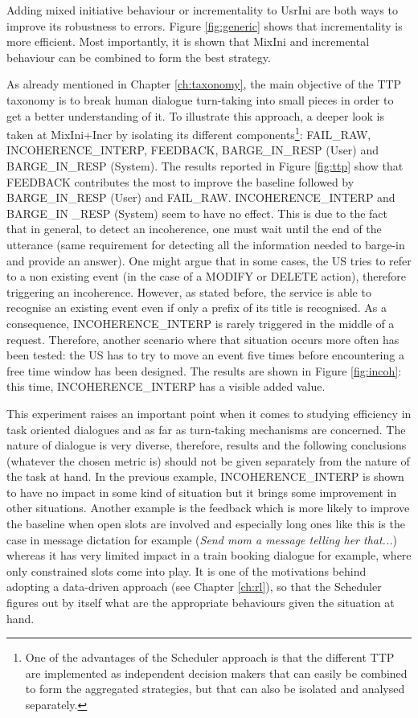      	Adding mixed initiative behaviour or incrementality to UsrIni are both ways to improve its robustness to errors. Figure \ref{fig:generic} shows that incrementality is more efficient. Most importantly, it is shown that MixIni and incremental behaviour can be combined to form the best strategy.
    
    	As already mentioned in Chapter \ref{ch:taxonomy}, the main objective of the TTP taxonomy is to break human dialogue turn-taking into small pieces in order to get a better understanding of it. To illustrate this approach, a deeper look is taken at MixIni+Incr by isolating its different components\footnote{One of the advantages of the Scheduler approach is that the different TTP are implemented as independent decision makers that can easily be combined to form the aggregated strategies, but that can also be isolated and analysed separately.}: FAIL\_RAW, INCOHERENCE\_INTERP, FEEDBACK, BARGE\_IN\_RESP (User) and BARGE\_IN\_RESP (System). The results reported in Figure \ref{fig:ttp} show that FEEDBACK contributes the most to improve the baseline followed by BARGE\_IN\_RESP (User) and FAIL\_RAW. INCOHERENCE\_INTERP and BARGE\_IN \_RESP (System) seem to have no effect. This is due to the fact that in general, to detect an incoherence, one must wait until the end of the utterance (same requirement for detecting all the information needed to barge-in and provide an answer). One might argue that in some cases, the US tries to refer to a non existing event (in the case of a MODIFY or DELETE action), therefore triggering an incoherence. However, as stated before, the service is able to recognise an existing event even if only a prefix of its title is recognised. As a consequence, INCOHERENCE\_INTERP is rarely triggered in the middle of a request. Therefore, another scenario where that situation occurs more often has been tested: the US has to try to move an event five times before encountering a free time window has been designed. The results are shown in Figure \ref{fig:incoh}: this time, INCOHERENCE\_INTERP has a visible added value.
				
				 This experiment raises an important point when it comes to studying efficiency in task oriented dialogues and as far as turn-taking mechanisms are concerned. The nature of dialogue is very diverse, therefore, results and the following conclusions (whatever the chosen metric is) should not be given separately from the nature of the task at hand. In the previous example, INCOHERENCE\_INTERP is shown to have no impact in some kind of situation but it brings some improvement in other situations. Another example is the feedback which is more likely to improve the baseline when open slots are involved and especially long ones like this is the case in message dictation for example (\textit{Send mom a message telling her that...}) whereas it has very limited impact in a train booking dialogue for example, where only constrained slots come into play. It is one of the motivations behind adopting a data-driven approach (see Chapter \ref{ch:rl}), so that the Scheduler figures out by itself what are the appropriate behaviours given the situation at hand.
        
        
    
